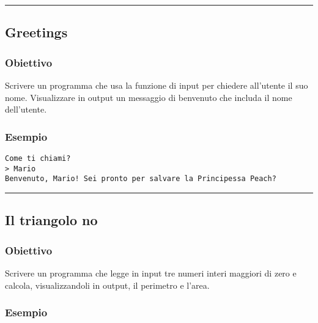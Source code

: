 \documentclass[
]{book}
\begin{document}
\begin{center}\rule{0.5\linewidth}{0.5pt}\end{center}

\hypertarget{greetings}{%
\subsection{Greetings}\label{greetings}}

\hypertarget{obiettivo-1}{%
\subsubsection*{Obiettivo}\label{obiettivo-1}}

Scrivere un programma che usa la funzione di input per chiedere all'utente il suo nome. Visualizzare in output un messaggio di benvenuto che includa il nome dell'utente.

\hypertarget{esempio}{%
\subsubsection*{Esempio}\label{esempio}}

\begin{verbatim}
Come ti chiami?
> Mario
Benvenuto, Mario! Sei pronto per salvare la Principessa Peach?
\end{verbatim}

\begin{center}\rule{0.5\linewidth}{0.5pt}\end{center}

\hypertarget{il-triangolo-no}{%
\subsection{Il triangolo no}\label{il-triangolo-no}}

\hypertarget{obiettivo-2}{%
\subsubsection*{Obiettivo}\label{obiettivo-2}}

Scrivere un programma che legge in input tre numeri interi maggiori di zero e calcola, visualizzandoli in output, il perimetro e l'area.

\hypertarget{esempio-1}{%
\subsubsection*{Esempio}\label{esempio-1}}
\end{document}
